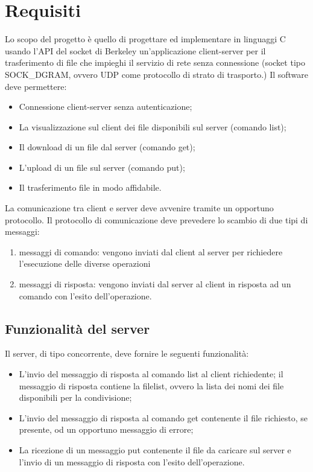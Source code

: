 \section{Requisiti}

Lo scopo del progetto è quello di progettare ed implementare in linguaggi C
usando l'API del socket di Berkeley un'applicazione client-server per il
trasferimento di file che impieghi il servizio di rete senza connessione
(socket tipo SOCK\_DGRAM, ovvero UDP come protocollo di strato di trasporto.)
Il software deve permettere:

\begin{itemize}
    \item Connessione client-server senza autenticazione;
    \item La visualizzazione sul client dei file disponibili sul server
          (comando list);
    \item Il download di un file dal server (comando get);
    \item L'upload di un file sul server (comando put);
    \item Il trasferimento file in modo affidabile.
\end{itemize}

La comunicazione tra client e server deve avvenire tramite un opportuno
protocollo. Il protocollo di comunicazione deve prevedere lo scambio di due
tipi di messaggi:

\begin{enumerate}
    \item messaggi di comando: vengono inviati dal client al server per
          richiedere l'esecuzione delle diverse operazioni
    \item messaggi di risposta: vengono inviati dal server al client in risposta
          ad un comando con l'esito dell'operazione.
\end{enumerate}

\subsection{Funzionalità del server}

Il server, di tipo concorrente, deve fornire le seguenti funzionalità:

\begin{itemize}
    \item L’invio del messaggio di risposta al comando list al client
          richiedente; il messaggio di risposta contiene la filelist, ovvero la
          lista dei nomi dei file disponibili per la condivisione;
    \item L’invio del messaggio di risposta al comando get contenente il file
          richiesto, se presente, od un opportuno messaggio di errore;
    \item La ricezione di un messaggio put contenente il file da caricare sul
          server e l’invio di un messaggio di risposta con l’esito
          dell’operazione.
\end{itemize}

